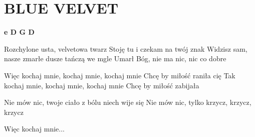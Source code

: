 \documentclass[../../../songbook.tex]{subfiles}
\begin{document}
\TabPositions{9cm} %
\section*{BLUE VELVET}
{}
\vspace{0.5cm}
{\color{red}\textbf{e D G D} } \newline

Rozchylone usta, velvetowa twarz		  \newline
Stoję tu i czekam na twój znak \newline
Widzisz sam, nasze zmarłe dusze tańczą we mgle \newline
Umarł Bóg, nie ma nic, nic co dobre \newline
                                                      
\-\hspace{1cm} Więc kochaj mnie, kochaj mnie, kochaj mnie	 \newline
\-\hspace{1cm} Chcę by miłość raniła cię					 \newline
\-\hspace{1cm} Tak kochaj mnie, kochaj mnie, kochaj mnie \newline
\-\hspace{1cm} Chcę by miłość zabijała \newline

Nie mów nic, twoje ciało z bólu niech wije się \newline
Nie mów nic, tylko krzycz, krzycz, krzycz \newline

\-\hspace{1cm} Więc kochaj mnie...
\end{document}
